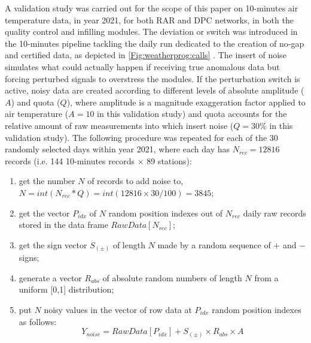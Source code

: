 \documentclass[authoryear,preprint,review,12pt]{elsarticle}
\newcommand{\note}[1]{\emph{\textcolor{red}{#1}}}
\begin{document}
A validation study was carried out for the scope of this paper on 10-minutes air temperature data, in year 2021, for both RAR and DPC networks, in both the quality control and infilling  modules.
The deviation or switch was introduced in the 10-minutes pipeline tackling the daily run dedicated to the creation of no-gap and certified data, as depicted in \cref{Fig:weatherprog:calls} .%
The insert of noise simulates what could actually happen if receiving true anomalous data but forcing perturbed signals to overstress the modules.
If the perturbation switch is active, noisy data are created according to different levels of absolute amplitude ($A$) and quota ($Q$), where amplitude is a magnitude exaggeration factor applied to air temperature ($A=10$ in this validation study) and quota accounts for the relative amount of raw measurements into which insert noise ($Q=30\%$ in this validation study).
The following procedure was repeated for each of the 30 randomly selected days within year 2021, where each day has $N_{rec}=12816$ records (i.e. 144 10-minutes records $\times$ 89 stations):

\begin{enumerate}
    \item get the number $N$ of records to add noise to, $N = int( N_{rec} * Q ) = int(12816 \times 30 / 100) = 3845$;
    \item get the vector $P_{idx}$ of $N$ random position indexes out of $N_{rec}$ daily raw records stored in the data frame $RawData[N_{rec}]$;
    \item get the sign vector $S_{(\pm)}$ of length $N$ made by a random sequence of $+$ and $-$ signs;
    \item generate a vector $R_{abs}$ of absolute random numbers of length $N$ from a uniform [0,1] distribution;
    \item put $N$ noisy values in the vector of row data at $P_{idx}$ random position indexes as follows:
    $$Y_{noise} = RawData[P_{idx}] + S_{(\pm)} \times R_{abs} \times A$$
\end{enumerate}
\end{document}
